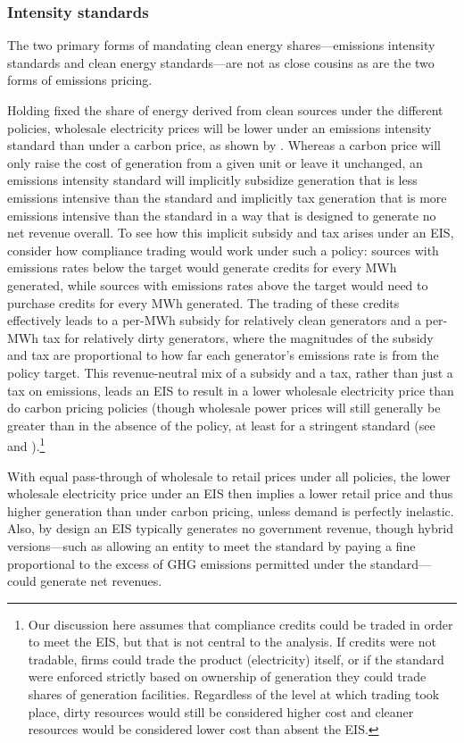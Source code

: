 \documentclass[12pt]{article}
\begin{document}
\subsubsection{Intensity standards} The two primary forms of mandating clean energy shares---emissions intensity standards and clean energy standards---are not as close cousins as are the two forms of emissions pricing. 

Holding fixed the share of energy derived from clean sources under the different policies, wholesale electricity prices will be lower under an emissions intensity standard than under a carbon price, as shown by \cite{holland2009greenhouse}. Whereas a carbon price will only raise the cost of generation from a given unit or leave it unchanged, an emissions intensity standard will implicitly subsidize generation that is less emissions intensive than the standard and implicitly tax generation that is more emissions intensive than the standard in a way that is designed to generate no net revenue overall. To see how this implicit subsidy and tax arises under an EIS, consider how compliance trading would work under such a policy: sources with emissions rates below the target would generate credits for every MWh generated, while sources with emissions rates above the target would need to purchase credits for every MWh generated. The trading of these credits effectively leads to a per-MWh subsidy for relatively clean generators and a per-MWh tax for relatively dirty generators, where the magnitudes of the subsidy and tax are proportional to how far each generator's emissions rate is from the policy target. This revenue-neutral mix of a subsidy and a tax, rather than just a tax on emissions, leads an EIS to result in a lower wholesale electricity price than do carbon pricing policies (though wholesale power prices will still generally be greater than in the absence of the policy, at least for a stringent standard (see \cite{holland2009greenhouse} and \cite{fowlie2014economic}).\footnote{Our discussion here assumes that compliance credits could be traded in order to meet the EIS, but that is not central to the analysis. If credits were not tradable, firms could trade the product (electricity) itself, or if the standard were enforced strictly based on ownership of generation they could trade shares of generation facilities. Regardless of the level at which trading took place, dirty resources would still be considered higher cost and cleaner resources would be considered lower cost than absent the EIS.} 

With equal pass-through of wholesale to retail prices under all policies, the lower wholesale electricity price under an EIS then implies a lower retail price and thus higher generation than under carbon pricing, unless demand is perfectly inelastic. Also, by design an EIS typically generates no government revenue, though hybrid versions---such as allowing an entity to meet the standard by paying a fine proportional to the excess of GHG emissions permitted under the standard---could generate net revenues.
\end{document}
